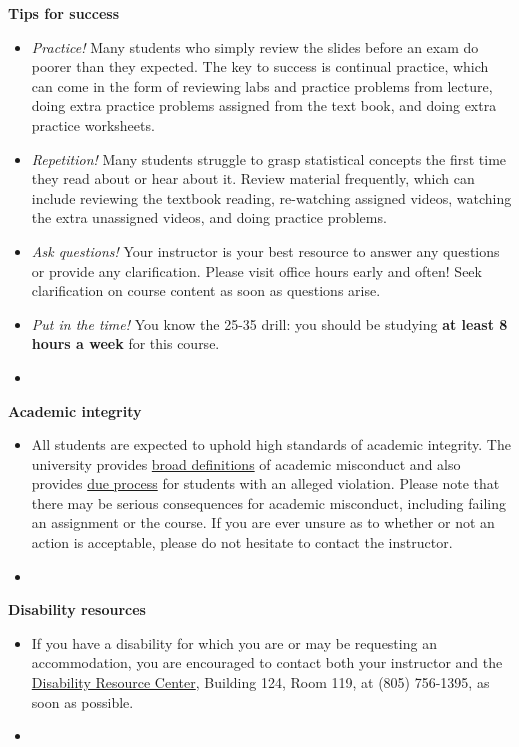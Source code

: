 \documentclass[letterpaper,12pt]{report}
\begin{document}
\textbf{Tips for success}
\begin{itemize}
\item \emph{Practice!}  Many students who simply review the slides before an exam do poorer than they expected. The key to success is continual practice, which can come in the form of reviewing labs and practice problems from lecture, doing extra practice problems assigned from the text book, and doing extra practice worksheets.
\item \emph{Repetition!}  Many students struggle to grasp statistical concepts the first time they read about or hear about it.  Review material frequently, which can include reviewing the textbook reading, re-watching assigned videos, watching the extra unassigned videos, and doing practice problems.
\item \emph{Ask questions!} Your instructor is your best resource to answer any questions or provide any clarification. Please visit office hours early and often!  Seek clarification on course content as soon as questions arise.
\item \emph{Put in the time!}  You know the 25-35 drill: you should be studying \textbf{at least 8 hours a week} for this course.
\item[]
\end{itemize}

\textbf{Academic integrity}
\begin{itemize}
\item[]
All students are expected to uphold high standards of academic integrity. The university provides \href{http://www.academicprograms.calpoly.edu/content/academicpolicies/Cheating}{broad definitions} of academic misconduct and also provides \href{http://www.osrr.calpoly.edu/process}{due process} for students with an alleged violation.  Please note that there may be serious consequences for academic misconduct, including failing an assignment or the course. If you are ever unsure as to whether or not an action is acceptable, please do not hesitate to contact the instructor.
\item[]
\end{itemize}

\textbf{Disability resources}
\begin{itemize}
\item[]
If you have a disability for which you are or may be requesting an accommodation, you are encouraged to contact both your instructor and the \href{http://drc.calpoly.edu/}{Disability Resource Center}, Building 124, Room 119, at (805) 756-1395, as soon as possible.
\item[]
\end{itemize}
\end{document}

